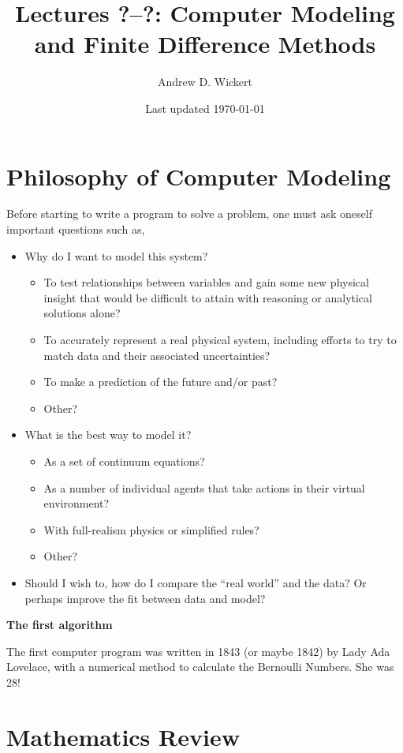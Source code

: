 \documentclass[a4paper,10pt]{scrartcl}
\title{Lectures ?--?: Computer Modeling and Finite Difference Methods}
\author{Andrew D. Wickert}
\date{Last updated \today}
\begin{document}
\maketitle

\section{Philosophy of Computer Modeling}

Before starting to write a program to solve a problem, one must ask oneself important questions such as,
\begin{itemize}
 \item Why do I want to model this system?
 \begin{itemize}
  \item To test relationships between variables and gain some new physical insight that would be difficult to attain with reasoning or analytical solutions alone?
  \item To accurately represent a real physical system, including efforts to try to match data and their associated uncertainties?
  \item To make a prediction of the future and/or past?
  \item Other?
 \end{itemize}
 \item What is the best way to model it?
 \begin{itemize}
  \item As a set of continuum equations?
  \item As a number of individual agents that take actions in their virtual environment?
  \item With full-realism physics or simplified rules?
  \item Other?
 \end{itemize}
 \item Should I wish to, how do I compare the ``real world'' and the data? Or perhaps improve the fit between data and model?
\end{itemize}

\begin{framed}
\noindent\textbf{The first algorithm}

The first computer program was written in 1843 (or maybe 1842) by Lady Ada Lovelace, with a numerical method to calculate the Bernoulli Numbers. She was 28!
\end{framed}

\section{Mathematics Review}
\end{document}

